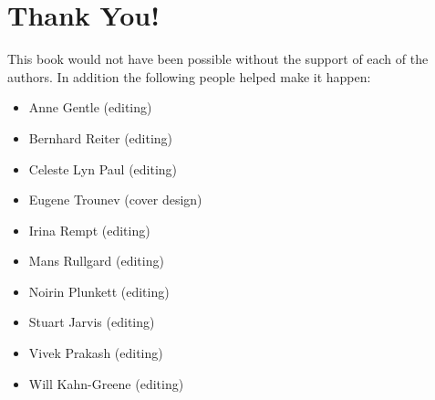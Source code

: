 \section*{Thank You!}

This book would not have been possible without the support of each of the
authors. In addition the following people helped make it happen:
\begin{itemize}
 \item Anne Gentle (editing)
 \item Bernhard Reiter (editing)
 \item Celeste Lyn Paul (editing)
 \item Eugene Trounev (cover design)
 \item Irina Rempt (editing)
 \item Mans Rullgard (editing)
 \item Noirin Plunkett (editing)
 \item Stuart Jarvis (editing)
 \item Vivek Prakash (editing)
 \item Will Kahn-Greene (editing)
\end{itemize}

\newpage